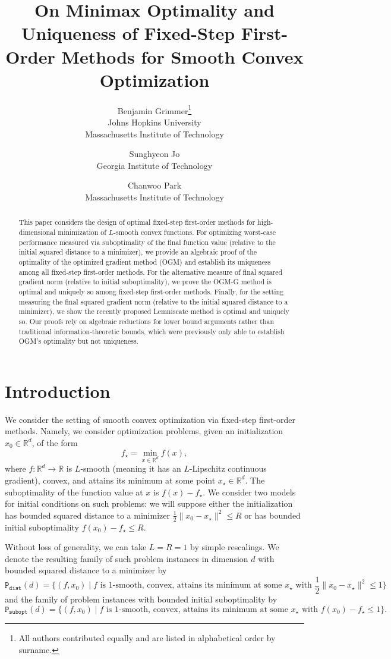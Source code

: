 \documentclass[11pt]{article}
\title{On Minimax Optimality and Uniqueness of Fixed-Step First-Order Methods for Smooth Convex Optimization}
\author{
Benjamin Grimmer\thanks{All authors contributed equally and are listed in alphabetical order by surname.}\\
\small Johns Hopkins University\\
\small Massachusetts Institute of Technology
\and
Sunghyeon Jo\footnotemark[1]\\
\small Georgia Institute of Technology
\and
Chanwoo Park\footnotemark[1]\\
\small Massachusetts Institute of Technology
}
\date{}
\begin{document}
\maketitle


\begin{abstract}
    This paper considers the design of optimal fixed-step first-order methods for high-dimensional minimization of $L$-smooth convex functions. For optimizing worst-case performance measured via suboptimality of the final function value (relative to the initial squared distance to a minimizer), we provide an algebraic proof of the optimality of the optimized gradient method (OGM) and establish its uniqueness among all fixed-step first-order methods. For the alternative measure of final squared gradient norm (relative to initial suboptimality), we prove the OGM-G method is optimal and uniquely so among fixed-step first-order methods. Finally, for the setting measuring the final squared gradient norm (relative to the initial squared distance to a minimizer), we show the recently proposed Lemniscate method is optimal and uniquely so. Our proofs rely on algebraic reductions for lower bound arguments rather than traditional information-theoretic bounds, which were previously only able to establish OGM's optimality but not uniqueness.
\end{abstract} 



\section{Introduction}
We consider the setting of smooth convex optimization via fixed-step first-order methods. Namely, we consider optimization problems, given an initialization $x_0\in\mathbb{R}^d$, of the form
\[
    f_\star = \min_{x\in\mathbb{R}^d} f(x),
\]
where $f\colon \mathbb{R}^d\rightarrow \mathbb{R}$ is $L$-smooth (meaning it has an $L$-Lipschitz continuous gradient), convex, and attains its minimum at some point $x_\star\in\mathbb{R}^d$. The suboptimality of the function value at $x$ is $f(x)-f_\star$. We consider two models for initial conditions on such problems: we will suppose either the initialization has bounded squared distance to a minimizer $\frac{1}{2}\|x_0-x_\star\|^2\leq R$ or has bounded initial suboptimality $f(x_0)-f_\star \leq R$.

Without loss of generality, we can take $L=R=1$ by simple rescalings. We denote the resulting family of such problem instances in dimension $d$ with bounded squared distance to a minimizer by 
\[ \mathtt{P}_\mathtt{dist}(d) = \{(f,x_0)\mid f\text{ is $1$-smooth, convex, attains its minimum at some $x_\star$ with $\frac{1}{2}\|x_0-x_\star\|^2\leq 1$} \} \]
and the family of problem instances with bounded initial suboptimality by
\[\mathtt{P}_\mathtt{subopt}(d) = \{(f,x_0)\mid f\text{ is $1$-smooth, convex, attains its minimum at some $x_\star$ with $f(x_0) - f_\star \leq 1$} \}.\]
\end{document}
